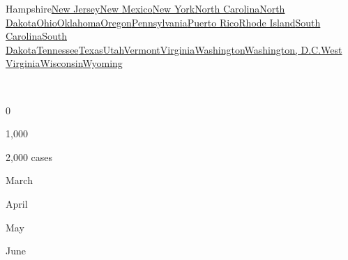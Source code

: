 {Hampshire}\href{https://www.nytimes.com/interactive/2020/us/new-jersey-coronavirus-cases.html}{New
Jersey}\href{https://www.nytimes.com/interactive/2020/us/new-mexico-coronavirus-cases.html}{New
Mexico}\href{https://www.nytimes.com/interactive/2020/us/new-york-coronavirus-cases.html}{New
York}\href{https://www.nytimes.com/interactive/2020/us/north-carolina-coronavirus-cases.html}{North
Carolina}\href{https://www.nytimes.com/interactive/2020/us/north-dakota-coronavirus-cases.html}{North
Dakota}\href{https://www.nytimes.com/interactive/2020/us/ohio-coronavirus-cases.html}{Ohio}\href{https://www.nytimes.com/interactive/2020/us/oklahoma-coronavirus-cases.html}{Oklahoma}\href{https://www.nytimes.com/interactive/2020/us/oregon-coronavirus-cases.html}{Oregon}\href{https://www.nytimes.com/interactive/2020/us/pennsylvania-coronavirus-cases.html}{Pennsylvania}\href{https://www.nytimes.com/interactive/2020/us/puerto-rico-coronavirus-cases.html}{Puerto
Rico}\href{https://www.nytimes.com/interactive/2020/us/rhode-island-coronavirus-cases.html}{Rhode
Island}\href{https://www.nytimes.com/interactive/2020/us/south-carolina-coronavirus-cases.html}{South
Carolina}\href{https://www.nytimes.com/interactive/2020/us/south-dakota-coronavirus-cases.html}{South
Dakota}\href{https://www.nytimes.com/interactive/2020/us/tennessee-coronavirus-cases.html}{Tennessee}\href{https://www.nytimes.com/interactive/2020/us/texas-coronavirus-cases.html}{Texas}\href{https://www.nytimes.com/interactive/2020/us/utah-coronavirus-cases.html}{Utah}\href{https://www.nytimes.com/interactive/2020/us/vermont-coronavirus-cases.html}{Vermont}\href{https://www.nytimes.com/interactive/2020/us/virginia-coronavirus-cases.html}{Virginia}\href{https://www.nytimes.com/interactive/2020/us/washington-coronavirus-cases.html}{Washington}\href{https://www.nytimes.com/interactive/2020/us/washington-dc-coronavirus-cases.html}{Washington,
D.C.}\href{https://www.nytimes.com/interactive/2020/us/west-virginia-coronavirus-cases.html}{West
Virginia}\href{https://www.nytimes.com/interactive/2020/us/wisconsin-coronavirus-cases.html}{Wisconsin}\href{https://www.nytimes.com/interactive/2020/us/wyoming-coronavirus-cases.html}{Wyoming}

~

0

1,000

2,000 cases

March

April

May

June

